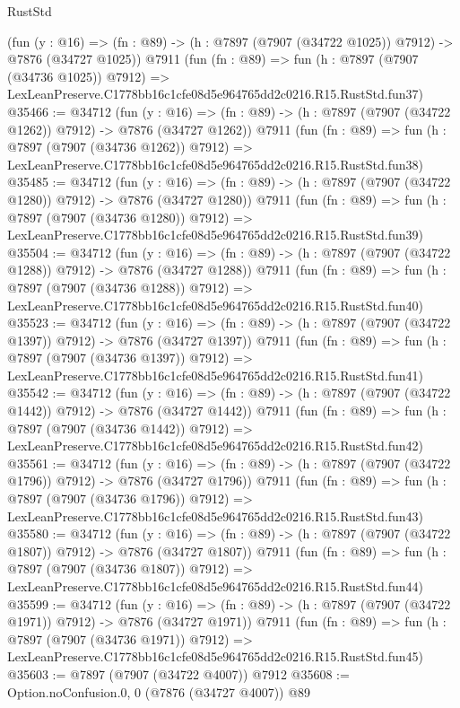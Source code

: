 \begin{lexlean}{RustStd}
\begin{coremodule}
    (fun (y : @16) =>
    (fn : @89) -> (h : @7897 (@7907 (@34722 @1025)) @7912) -> @7876 (@34727 @1025))
    @7911
    (fun (fn : @89) =>
    fun (h : @7897 (@7907 (@34736 @1025)) @7912) =>
    LexLeanPreserve.C1778bb16c1cfe08d5e964765dd2c0216.R15.RustStd.fun37)
@35466 := @34712
    (fun (y : @16) =>
    (fn : @89) -> (h : @7897 (@7907 (@34722 @1262)) @7912) -> @7876 (@34727 @1262))
    @7911
    (fun (fn : @89) =>
    fun (h : @7897 (@7907 (@34736 @1262)) @7912) =>
    LexLeanPreserve.C1778bb16c1cfe08d5e964765dd2c0216.R15.RustStd.fun38)
@35485 := @34712
    (fun (y : @16) =>
    (fn : @89) -> (h : @7897 (@7907 (@34722 @1280)) @7912) -> @7876 (@34727 @1280))
    @7911
    (fun (fn : @89) =>
    fun (h : @7897 (@7907 (@34736 @1280)) @7912) =>
    LexLeanPreserve.C1778bb16c1cfe08d5e964765dd2c0216.R15.RustStd.fun39)
@35504 := @34712
    (fun (y : @16) =>
    (fn : @89) -> (h : @7897 (@7907 (@34722 @1288)) @7912) -> @7876 (@34727 @1288))
    @7911
    (fun (fn : @89) =>
    fun (h : @7897 (@7907 (@34736 @1288)) @7912) =>
    LexLeanPreserve.C1778bb16c1cfe08d5e964765dd2c0216.R15.RustStd.fun40)
@35523 := @34712
    (fun (y : @16) =>
    (fn : @89) -> (h : @7897 (@7907 (@34722 @1397)) @7912) -> @7876 (@34727 @1397))
    @7911
    (fun (fn : @89) =>
    fun (h : @7897 (@7907 (@34736 @1397)) @7912) =>
    LexLeanPreserve.C1778bb16c1cfe08d5e964765dd2c0216.R15.RustStd.fun41)
@35542 := @34712
    (fun (y : @16) =>
    (fn : @89) -> (h : @7897 (@7907 (@34722 @1442)) @7912) -> @7876 (@34727 @1442))
    @7911
    (fun (fn : @89) =>
    fun (h : @7897 (@7907 (@34736 @1442)) @7912) =>
    LexLeanPreserve.C1778bb16c1cfe08d5e964765dd2c0216.R15.RustStd.fun42)
@35561 := @34712
    (fun (y : @16) =>
    (fn : @89) -> (h : @7897 (@7907 (@34722 @1796)) @7912) -> @7876 (@34727 @1796))
    @7911
    (fun (fn : @89) =>
    fun (h : @7897 (@7907 (@34736 @1796)) @7912) =>
    LexLeanPreserve.C1778bb16c1cfe08d5e964765dd2c0216.R15.RustStd.fun43)
@35580 := @34712
    (fun (y : @16) =>
    (fn : @89) -> (h : @7897 (@7907 (@34722 @1807)) @7912) -> @7876 (@34727 @1807))
    @7911
    (fun (fn : @89) =>
    fun (h : @7897 (@7907 (@34736 @1807)) @7912) =>
    LexLeanPreserve.C1778bb16c1cfe08d5e964765dd2c0216.R15.RustStd.fun44)
@35599 := @34712
    (fun (y : @16) =>
    (fn : @89) -> (h : @7897 (@7907 (@34722 @1971)) @7912) -> @7876 (@34727 @1971))
    @7911
    (fun (fn : @89) =>
    fun (h : @7897 (@7907 (@34736 @1971)) @7912) =>
    LexLeanPreserve.C1778bb16c1cfe08d5e964765dd2c0216.R15.RustStd.fun45)
@35603 := @7897 (@7907 (@34722 @4007)) @7912
@35608 := Option.noConfusion.{0, 0} (@7876 (@34727 @4007)) @89

\end{coremodule}
\end{lexlean}
